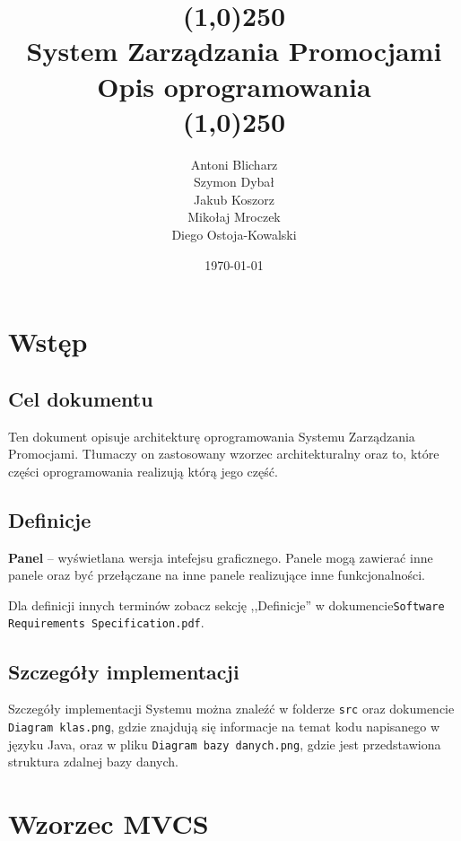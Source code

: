 \documentclass[a4paper,12pt]{article}
\title{
    \line(1,0){250}\\
    System Zarządzania Promocjami\\
    Opis oprogramowania\\
    \line(1,0){250}}
\author{Antoni Blicharz\\
        Szymon Dybał\\
        Jakub Koszorz\\
        Mikołaj Mroczek\\
        Diego Ostoja-Kowalski\\}
\date{\today}
\begin{document}
\begin{titlepage}
    \maketitle
\end{titlepage}

\newpage

\section{Wstęp}

\subsection{Cel dokumentu}

Ten dokument opisuje architekturę oprogramowania Systemu Zarządzania Promocjami.
Tłumaczy on zastosowany wzorzec architekturalny oraz to, które części oprogramowania realizują którą jego część.

\subsection{Definicje}

\textbf{Panel} -- wyświetlana wersja intefejsu graficznego.
Panele mogą zawierać inne panele oraz być przełączane na inne panele realizujące inne funkcjonalności.

Dla definicji innych terminów zobacz sekcję ,,Definicje'' w dokumencie\linebreak\texttt{Software Requirements Specification.pdf}.

\subsection{Szczegóły implementacji}

Szczegóły implementacji Systemu można znaleźć w folderze \texttt{src} oraz dokumencie \texttt{Diagram klas.png}, gdzie znajdują się informacje na temat kodu napisanego w języku Java, oraz w pliku \texttt{Diagram bazy danych.png}, gdzie jest przedstawiona struktura zdalnej bazy danych.

\section{Wzorzec MVCS}
\end{document}
